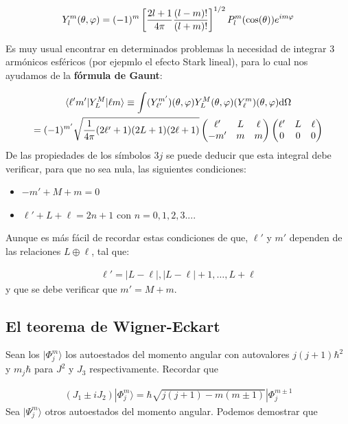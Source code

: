 \begin{equation}
    Y_l^m (\theta,\varphi) = (-1)^m \left[ \frac{2l+1}{4 \pi} \frac{(l-m)!}{(l+m)!} \right]^{1/2} P_l^m (\cos (\theta)) e^{im\varphi}
\end{equation}

Es muy usual encontrar en determinados problemas la necesidad de integrar 3 armónicos esféricos (por ejepmlo el efecto Stark lineal), para lo cual nos ayudamos de la \textbf{fórmula de Gaunt}:

\begin{multline}
	\langle \ell' m' | Y_{L}^M | \ell m \rangle \equiv  \int ( Y_{\ell'}^{m'} ) (\theta,\varphi)  Y_{L}^M  (\theta,\varphi) (Y_{\ell}^{m}) (\theta,\varphi) \mathrm{d} \Omega  \\ = (-1)^{m'} \sqrt{\frac{1}{4\pi} (2\ell'+1)(2L+1)(2\ell+1)} \begin{pmatrix}
	\ell' & L & \ell  \\ -m' & m & m
	\end{pmatrix}\begin{pmatrix}
	\ell' & L & \ell \\ 0 & 0 & 0
	\end{pmatrix}
\end{multline}
De las propiedades de los símbolos $3j$ se puede deducir que esta integral debe verificar, para que no sea nula, las siguientes condiciones:

\begin{itemize}
	\item $-m'+M+m=0$
	\item $\ell'+L+\ell = 2n+1$ con $n=0,1,2,3...$.
\end{itemize}
Aunque es más fácil de recordar estas condiciones de que, $\ell'$ y $m'$ dependen de las relaciones $L\oplus \ell$, tal que:

\begin{eqnarray}
	\ell'=|L-\ell|,|L-\ell|+1,\ldots,L+\ell
\end{eqnarray}
y que se debe verificar que $m'=M+m$.

\subsection{El teorema de Wigner-Eckart}

Sean los $|\Phi_j^m\rangle$ los autoestados del momento angular con autovalores $j(j+1 )\hbar^2$ y $m_j \hbar$ para $J^2$ y $J_3$ respectivamente. Recordar que

\begin{eqnarray}
    (J_1\pm iJ_2) |\Phi_j^m \rangle = \hbar \sqrt{j(j+1)-m(m\pm 1)} |\Phi_j^{m\pm 1}
\end{eqnarray}
Sea $|\Psi_j^m\rangle$ otros autoestados del momento angular. Podemos demostrar que

